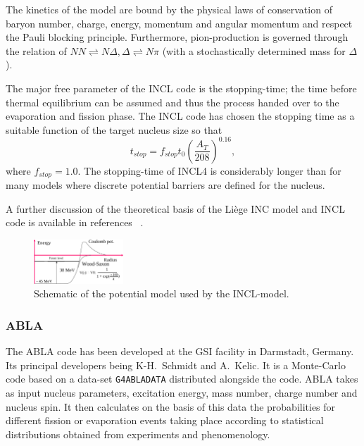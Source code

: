 The kinetics of the model are bound by the physical laws of conservation of baryon number, charge, energy, momentum and angular momentum and respect the Pauli blocking principle. Furthermore, pion-production is governed through the relation of $NN \rightleftharpoons N \Delta, \Delta \rightleftharpoons N\pi$ (with a stochastically determined mass for $\Delta$).

The major free parameter of the INCL code is the stopping-time; the time before thermal equilibrium can be assumed and thus the process handed over to the evaporation and fission phase. The INCL code has chosen the stopping time as a suitable function of the target nucleus size so that $$t_{stop} = f_{stop}t_{0}(\frac{A_T}{208})^{0.16},$$ where $f_{stop} = 1.0$. The stopping-time of INCL4 is considerably longer than for many models where discrete potential barriers are defined for the nucleus.

A further discussion of the theoretical basis of the Liège INC model and INCL code is available in references ~\cite{PhysRevC.66.044615,iia}.

\begin{figure}[ht]
\begin{center}
\includegraphics[width=0.3\textwidth]{images/inclPotential.png}  
\caption{\label{fig:inclpotential} Schematic of the potential model used by the INCL-model.}
 
 \end{center}
 \end{figure}


\subsubsection{ABLA}

The ABLA code has been developed at the GSI facility in Darmstadt, Germany. Its principal developers being K-H.~Schmidt and A.~Kelic. It is a Monte-Carlo code based on a data-set {\tt G4ABLADATA} distributed alongside the code. ABLA takes as input nucleus parameters, excitation energy, mass number, charge number and nucleus spin. It then calculates on the basis of this data the probabilities for different fission or evaporation events taking place according to statistical distributions obtained from experiments and phenomenology.

